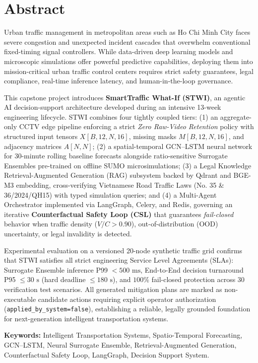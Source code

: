 \chapter*{Abstract}

\noindent Urban traffic management in metropolitan areas such as Ho Chi Minh City faces severe congestion and unexpected incident cascades that overwhelm conventional fixed-timing signal controllers. While data-driven deep learning models and microscopic simulations offer powerful predictive capabilities, deploying them into mission-critical urban traffic control centers requires strict safety guarantees, legal compliance, real-time inference latency, and human-in-the-loop governance.

\vspace{0.3cm}
\noindent This capstone project introduces \textbf{SmartTraffic What-If (STWI)}, an agentic AI decision-support architecture developed during an intensive 13-week engineering lifecycle. STWI combines four tightly coupled tiers: (1) an aggregate-only CCTV edge pipeline enforcing a strict \textit{Zero Raw-Video Retention} policy with structured input tensors $X[B,12,N,16]$, missing masks $M[B,12,N,16]$, and adjacency matrices $A[N,N]$; (2) a spatial-temporal GCN--LSTM neural network for 30-minute rolling baseline forecasts alongside ratio-sensitive Surrogate Ensembles pre-trained on offline SUMO microsimulations; (3) a Legal Knowledge Retrieval-Augmented Generation (RAG) subsystem backed by Qdrant and BGE-M3 embedding, cross-verifying Vietnamese Road Traffic Laws (No. 35 \& 36/2024/QH15) with typed simulation queries; and (4) a Multi-Agent Orchestrator implemented via LangGraph, Celery, and Redis, governing an iterative \textbf{Counterfactual Safety Loop (CSL)} that guarantees \textit{fail-closed} behavior when traffic density ($V/C > 0.90$), out-of-distribution (OOD) uncertainty, or legal invalidity is detected.

\vspace{0.3cm}
\noindent Experimental evaluation on a versioned 20-node synthetic traffic grid confirms that STWI satisfies all strict engineering Service Level Agreements (SLAs): Surrogate Ensemble inference P99 $< 500\text{ ms}$, End-to-End decision turnaround P95 $\le 30\text{ s}$ (hard deadline $\le 180\text{ s}$), and $100\%$ fail-closed protection across 30 verification test scenarios. All generated mitigation plans are marked as non-executable candidate actions requiring explicit operator authorization (\texttt{applied\_by\_system=false}), establishing a reliable, legally grounded foundation for next-generation intelligent transportation systems.

\vspace{0.8cm}
\noindent \textbf{Keywords:} Intelligent Transportation Systems, Spatio-Temporal Forecasting, GCN--LSTM, Neural Surrogate Ensemble, Retrieval-Augmented Generation, Counterfactual Safety Loop, LangGraph, Decision Support System.
